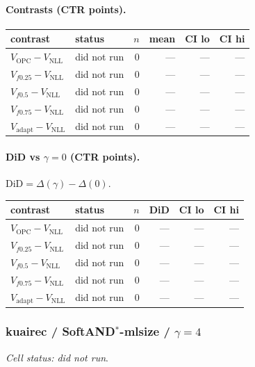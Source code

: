 \documentclass[10pt,a4paper]{article}
\begin{document}
\paragraph{Contrasts (CTR points).}
{\centering\small\begin{tabular}{llrrrr}
\toprule contrast & status & $n$ & mean & CI lo & CI hi \\
\midrule
$V_{\mathrm{OPC}}-V_{\mathrm{NLL}}$ & did not run & 0 & --- & --- & --- \\
$V_{f0.25}-V_{\mathrm{NLL}}$ & did not run & 0 & --- & --- & --- \\
$V_{f0.5}-V_{\mathrm{NLL}}$ & did not run & 0 & --- & --- & --- \\
$V_{f0.75}-V_{\mathrm{NLL}}$ & did not run & 0 & --- & --- & --- \\
$V_{\mathrm{adapt}}-V_{\mathrm{NLL}}$ & did not run & 0 & --- & --- & --- \\
\bottomrule\end{tabular}\par}
\paragraph{DiD vs $\gamma=0$ (CTR points).} $\mathrm{DiD}=\Delta(\gamma)-\Delta(0)$.
{\centering\small\begin{tabular}{llrrrr}
\toprule contrast & status & $n$ & DiD & CI lo & CI hi \\
\midrule
$V_{\mathrm{OPC}}-V_{\mathrm{NLL}}$ & did not run & 0 & --- & --- & --- \\
$V_{f0.25}-V_{\mathrm{NLL}}$ & did not run & 0 & --- & --- & --- \\
$V_{f0.5}-V_{\mathrm{NLL}}$ & did not run & 0 & --- & --- & --- \\
$V_{f0.75}-V_{\mathrm{NLL}}$ & did not run & 0 & --- & --- & --- \\
$V_{\mathrm{adapt}}-V_{\mathrm{NLL}}$ & did not run & 0 & --- & --- & --- \\
\bottomrule\end{tabular}\par}
\bigskip
\subsubsection{kuairec / SoftAND$^*$-mlsize / $\gamma=4$}
\emph{Cell status: did not run}.
\end{document}
